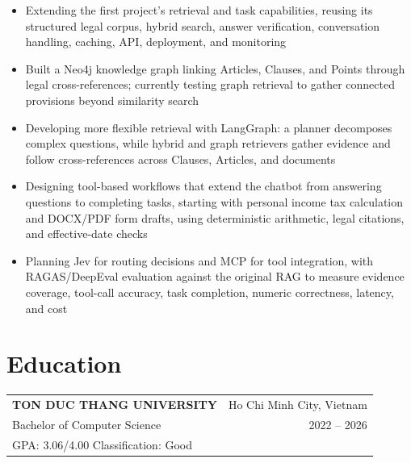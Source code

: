 \documentclass[10pt]{article}
\begin{document}
\begin{itemize}[topsep=0pt, itemsep=2pt]
    \item Extending the first project's retrieval and task capabilities, reusing its structured legal corpus, hybrid search, answer verification, conversation handling, caching, API, deployment, and monitoring
    \item Built a Neo4j knowledge graph linking Articles, Clauses, and Points through legal cross-references; currently testing graph retrieval to gather connected provisions beyond similarity search
    \item Developing more flexible retrieval with LangGraph: a planner decomposes complex questions, while hybrid and graph retrievers gather evidence and follow cross-references across Clauses, Articles, and documents
    \item Designing tool-based workflows that extend the chatbot from answering questions to completing tasks, starting with personal income tax calculation and DOCX/PDF form drafts, using deterministic arithmetic, legal citations, and effective-date checks
    \item Planning Jev for routing decisions and MCP for tool integration, with RAGAS/DeepEval evaluation against the original RAG to measure evidence coverage, tool-call accuracy, task completion, numeric correctness, latency, and cost
\end{itemize}


\section*{Education}

\begin{tabularx}{\textwidth}{@{}Xr@{}}
    \textbf{TON DUC THANG UNIVERSITY}
    & Ho Chi Minh City, Vietnam \\[2pt]

    Bachelor of Computer Science
    & 2022 -- 2026 \\[2pt]

    GPA: 3.06/4.00 \quad Classification: Good
    & \\
\end{tabularx}


\newpage
\end{document}
